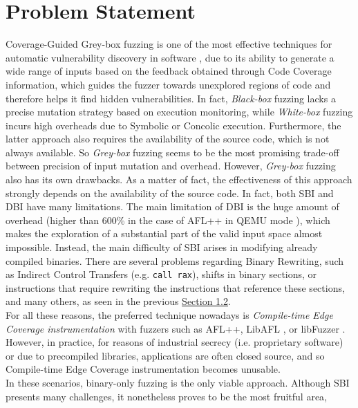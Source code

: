 \section{Problem Statement}\label{sec:problem_statement}
    Coverage-Guided Grey-box fuzzing is one of the most effective techniques for automatic vulnerability discovery in software
    \cite{zafl,Boehme2016},
    due to its ability to generate a wide range of inputs based on the feedback obtained through Code Coverage information,
    which guides the fuzzer towards unexplored regions of code and therefore helps it find hidden vulnerabilities.
    In fact, \textit{Black-box} fuzzing lacks a precise mutation strategy based on execution monitoring, while
    \textit{White-box} fuzzing incurs high overheads due to Symbolic or Concolic execution.
    Furthermore, the latter approach also requires the availability of the source code, which is not always available.
    So \textit{Grey-box} fuzzing seems to be the most promising trade-off between precision of input mutation and overhead.
    However, \textit{Grey-box} fuzzing also has its own drawbacks.
    As a matter of fact, the effectiveness of this approach strongly depends on the availability of the source code.
    In fact, both \gls{SBI} and \gls{DBI} have many limitations.
    The main limitation of \gls{DBI} is the huge amount of overhead (higher than 600\% in the case of AFL++ in QEMU
    mode \cite{zafl}), which makes the exploration of a substantial part
    of the valid input space almost impossible.
    Instead, the main difficulty of \gls{SBI} arises in modifying already compiled binaries.
    There are several problems regarding Binary Rewriting, such as Indirect Control Transfers (e.g. \texttt{call rax}),
    shifts in binary sections, or instructions that require rewriting the instructions that reference these sections, and many others,
    as seen in the previous \hyperref[sec:biniary_rewriting]{Section 1.2}.\\
    For all these reasons, the preferred technique nowadays is \textit{Compile-time Edge Coverage instrumentation} with fuzzers such as
    AFL++, LibAFL \cite{libafl}, or libFuzzer \cite{libfuzzer}.
    However, in practice, for reasons of industrial secrecy (i.e. proprietary software) or due to precompiled libraries, applications are
    often closed source, and so Compile-time Edge Coverage instrumentation becomes unusable.\\
    In these scenarios, binary-only fuzzing is the only viable approach.
    Although \gls{SBI} presents many challenges, it nonetheless proves to be the most fruitful area,

